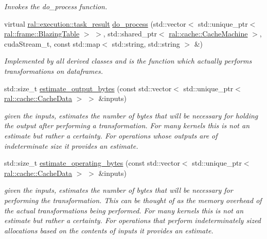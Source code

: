 \begin{DoxyCompactItemize}
\begin{DoxyCompactList}\small\item\em Invokes the do\+\_\+process function. \end{DoxyCompactList}\item 
virtual \hyperlink{structral_1_1execution_1_1task__result}{ral\+::execution\+::task\+\_\+result} \hyperlink{classral_1_1cache_1_1kernel_aa8d19c5f112f8965ea2f9999fb5fd625}{do\+\_\+process} (std\+::vector$<$ std\+::unique\+\_\+ptr$<$ \hyperlink{classral_1_1frame_1_1BlazingTable}{ral\+::frame\+::\+Blazing\+Table} $>$ $>$, std\+::shared\+\_\+ptr$<$ \hyperlink{classral_1_1cache_1_1CacheMachine}{ral\+::cache\+::\+Cache\+Machine} $>$, cuda\+Stream\+\_\+t, const std\+::map$<$ std\+::string, std\+::string $>$ \&)
\begin{DoxyCompactList}\small\item\em Implemented by all derived classes and is the function which actually performs transformations on dataframes. \end{DoxyCompactList}\item 
std\+::size\+\_\+t \hyperlink{classral_1_1cache_1_1kernel_a37da9a64d455f2b833e1e7576c9a17d2}{estimate\+\_\+output\+\_\+bytes} (const std\+::vector$<$ std\+::unique\+\_\+ptr$<$ \hyperlink{classral_1_1cache_1_1CacheData}{ral\+::cache\+::\+Cache\+Data} $>$ $>$ \&inputs)
\begin{DoxyCompactList}\small\item\em given the inputs, estimates the number of bytes that will be necessary for holding the output after performing a transformation. For many kernels this is not an estimate but rather a certainty. For operations whose outputs are of indeterminate size it provides an estimate. \end{DoxyCompactList}\item 
std\+::size\+\_\+t \hyperlink{classral_1_1cache_1_1kernel_a33a881d5e40d033e53a73f3c7ede5d03}{estimate\+\_\+operating\+\_\+bytes} (const std\+::vector$<$ std\+::unique\+\_\+ptr$<$ \hyperlink{classral_1_1cache_1_1CacheData}{ral\+::cache\+::\+Cache\+Data} $>$ $>$ \&inputs)
\begin{DoxyCompactList}\small\item\em given the inputs, estimates the number of bytes that will be necessary for performing the transformation. This can be thought of as the memory overhead of the actual transformations being performed. For many kernels this is not an estimate but rather a certainty. For operations that perform indeterminately sized allocations based on the contents of inputs it provides an estimate. \end{DoxyCompactList}\item 

\end{DoxyCompactItemize}
